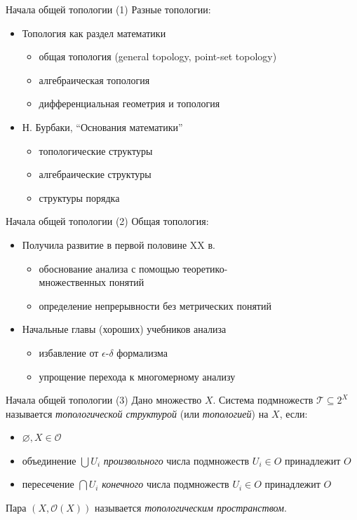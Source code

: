 \documentclass{beamer}
\begin{document}
\begin{frame}{Начала общей топологии (1)}
Разные топологии:\\
\bigskip
\begin{itemize}
	\item Топология как раздел математики
		\begin{itemize}
			\item общая топология (general topology, point-set topology)
			\item алгебраическая топология
			\item дифференциальная геометрия и топология
		\end{itemize}
	\bigskip
	\item Н. Бурбаки, ``Основания математики''
		\begin{itemize}
			\item топологические структуры
			\item алгебраические структуры
			\item структуры порядка
		\end{itemize}
\end{itemize}
\end{frame}

\begin{frame}{Начала общей топологии (2)}
Общая топология:\\
\bigskip
\begin{itemize}
	\item Получила развитие в первой половине XX в.
		\begin{itemize}
			\item обоснование анализа с помощью теоретико-\\множественных понятий
			\item определение непрерывности без метрических понятий
		\end{itemize}
	\bigskip
	\item Начальные главы (хороших) учебников анализа
		\begin{itemize}
			\item избавление от $\epsilon$-$\delta$ формализма
			\item упрощение перехода к многомерному анализу
		\end{itemize}
\end{itemize}
\end{frame}


\begin{frame}{Начала общей топологии (3)}
Дано множество $X$. Система подмножеств $\mathcal{T} \subseteq 2^X$ называется \textit{топологической структурой} (или \textit{топологией}) на $X$, если:\\
\bigskip
\begin{itemize}
	\item $\varnothing, X \in \mathcal{O}$
	\item объединение $\bigcup U_i$ \textit{произвольного} числа подмножеств $U_i \in O$ принадлежит $O$
	\item пересечение $\bigcap U_i$ \textit{конечного} числа подмножеств $U_i \in O$ принадлежит $O$
\end{itemize}
\bigskip
Пара $(X, \mathcal{O}(X))$ называется \textit{топологическим пространством}.
\end{frame}
\end{document}
